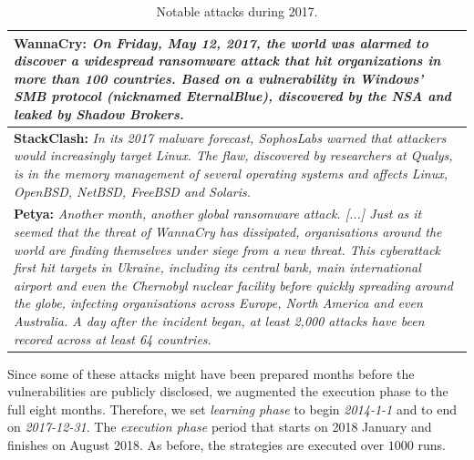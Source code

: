  \begin{table}[h]
 \begin{center}
 {
\small%
 \begin{tabular}{ | p{} | }\hline
 \textbf{WannaCry:} 
 \emph{On Friday, May 12, 2017, the world was alarmed to discover a widespread ransomware attack that hit organizations in more than 100 countries. Based on a vulnerability in Windows' SMB protocol (nicknamed EternalBlue), discovered by the NSA and leaked by Shadow Brokers.} \\
 \hline

 \textbf{StackClash:} 
 \emph{In its 2017 malware forecast, SophosLabs warned that attackers would increasingly target Linux. The flaw, discovered by researchers at Qualys, is in the memory management of several operating systems and affects Linux, OpenBSD, NetBSD, FreeBSD and Solaris.}\\
 \hline

 \textbf{Petya:} 
 \emph{Another month, another global ransomware attack. [...] Just as it seemed that the threat of WannaCry has dissipated, organisations around the world are finding themselves under siege from a new threat. This cyberattack first hit targets in Ukraine, including its central bank, main international airport and even the Chernobyl nuclear facility before quickly spreading around the globe, infecting organisations across Europe, North America and even Australia. A day after the incident began, at least 2,000 attacks have been recored across at least 64 countries.}\\
 \hline
 \end{tabular}
 }
 \caption{Notable attacks during 2017.}
 \label{tab:special_vulns}
 \end{center}
 \end{table}


Since some of these attacks might have been prepared months before the vulnerabilities are publicly disclosed, we augmented the execution phase to the full eight months. 
Therefore, we set \emph{learning phase} to begin \emph{2014-1-1} and to end on \emph{2017-12-31}. 
The \emph{execution phase} period that starts on 2018 January and finishes on August 2018. 
As before, the strategies are executed over $1000$ runs. 


